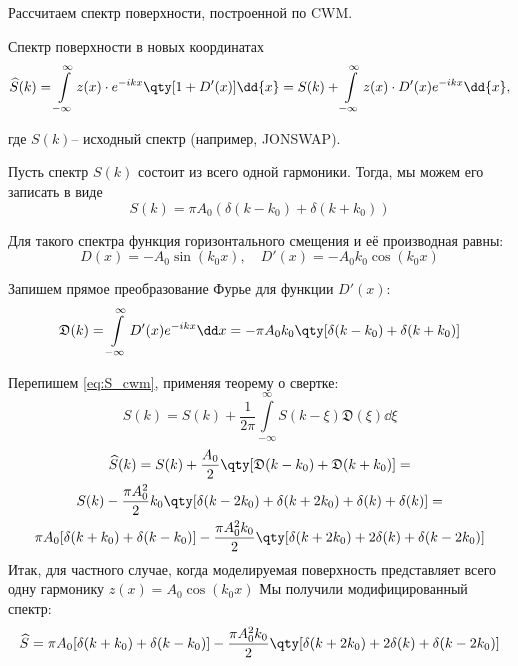 \documentclass[a4paper,14pt]{extarticle}
\begin{document}
Рассчитаем спектр  поверхности, построенной по CWM.

 Спектр поверхности в новых координатах 
 \begin{equation}
     \label{eq:S_cwm}
     \widehat S(k) = \int\limits_{-\infty}^{\infty} z(x) \cdot  
     e^{-ikx} \qty[ 1 + D'(x)]
     \dd{x}  = S(k) + \int\limits_{-\infty}^{\infty} z(x) \cdot D'(x)  
     e^{-ikx}\dd{x},
 \end{equation}

 где $S(k)$-- исходный спектр (например, JONSWAP).

 Пусть спектр $S(k)$ состоит из всего одной гармоники. Тогда, мы можем его
 записать в виде
 \begin{equation}
     \label{eq:}
     S(k) = \pi A_{0}( \delta(k-k_{0}) + \delta(k+k_{0}))
 \end{equation}

 Для такого спектра функция горизонтального смещения и её производная равны:
 \begin{equation}
     \label{eq:}
     D(x) = -A_{0} \sin(k_{0} x), \quad
     D'(x) = -A_{0} k_{0} \cos(k_{0} x)
 \end{equation}

 Запишем прямое преобразование Фурье для функции $D'(x)$:
 \newcommand{\D}{\mathfrak{D}}
  \begin{equation}
     \label{eq:}
     \D(k) = \int\limits_{-\infty}^{\infty} D'(x) e^{-ikx} \dd x =
     - \pi A_{0}k_{0}\qty[\delta(k-k_{0})+\delta(k+k_{0})]
 \end{equation}

 Перепишем \eqref{eq:S_cwm}, применяя теорему о свертке:
\begin{equation}
    \label{eq:}
    \widehat S(k) = S(k) +
    \frac{1}{2\pi} \int\limits_{-\infty}^{\infty} S(k-\xi) \D(\xi) \dd \xi 
\end{equation}
\begin{gather}
    \label{eq:}
    \widehat S(k) = S(k) + \frac{A_{0}}{2} \qty[\D(k-k_{0}) + \D(k+k_{0})] = \\
    S(k) - \frac{\pi A_{0}^2}{2} k_{0} \qty[
    \delta(k-2k_{0}) +
    \delta(k+2k_{0}) +
    \delta(k) +
    \delta(k) 
    ] = \\
    \pi A_{0}[\delta(k+k_{0})+ \delta(k-k_{0})] -
    \frac{\pi A_{0}^2k_{0}}{2}\qty[ \delta(k+2k_{0}) + 2\delta(k) +
    \delta(k-2k_{0})]
\end{gather}
Итак, для частного случае, когда моделируемая поверхность представляет всего
одну гармонику $z(x) = A_{0}\cos(k_{0}x)$
Мы получили модифицированный спектр:
\begin{equation}
    \label{eq:}
    \widehat S = 
    \pi A_{0}[\delta(k+k_{0})+ \delta(k-k_{0})] -
    \frac{\pi A_{0}^2k_{0}}{2}\qty[ \delta(k+2k_{0}) + 2\delta(k) +
    \delta(k-2k_{0})]
\end{equation}
\end{document}
